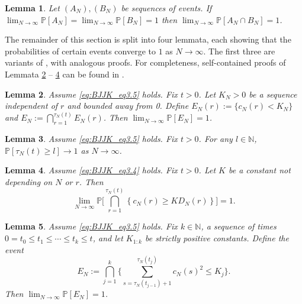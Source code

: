 \documentclass[12pt,authoryear]{article}
\newtheorem{lemma}{Lemma}
\theoremstyle{definition}
\newcommand{\Prob}{\mathbb{P}}
\newcommand{\1}[1]{\mathbbm{1}_{#1}}
\begin{document}
\begin{lemma}{\cite[Lemma 4.11]{brown2021thesis}}\label{thm:lim_AandB}
Let $(A_N) , (B_N)$ be sequences of events. 
If $\lim_{N\to\infty}\Prob[A_N] = \lim_{N\to\infty}\Prob[B_N]=1$ then $\lim_{N\to\infty} \Prob [A_N \cap B_N] =1$.
\end{lemma}

The remainder of this section is split into four lemmata, each showing that the probabilities of certain events converge to $1$ as $N\to\infty$.
The first three are variants of \citet[Supplement, Lemma 4]{koskela2022erratum}, with analogous proofs.
For completeness, self-contained proofs of Lemmata \ref{thm:indicators_cN} -- \ref{thm:indicators_DN} can be found in \citet[Lemmata 4.12--4.14]{brown2021thesis}.

\begin{lemma}\label{thm:indicators_cN}
Assume \eqref{eq:BJJK_eq3.5} holds. Fix $t>0$.
Let $K_N>0$ be a sequence independent of $r$ and bounded away from 0.
Define $E_N(r) := \{ c_N(r) < K_N \}$ and $E_N := \bigcap_{r=1}^{\tau_N(t)} E_N(r)$.
Then $\lim_{N\to\infty} \Prob[E_N]=1$.
\end{lemma}

\begin{lemma}\label{thm:indicators_tau}
Assume \eqref{eq:BJJK_eq3.5} holds.
Fix $t > 0$.
For any $l \in \mathbb{N}$, $\Prob[ \tau_N(t) \geq l ] \to 1$ as $N \to \infty$.
\end{lemma}

\begin{lemma}\label{thm:indicators_DN}
Assume \eqref{eq:BJJK_eq3.4} holds.
Fix $t>0$.
Let $K$ be a constant not depending on $N$ or $r$.
Then
\begin{equation*}
\lim_{N\to\infty} \Prob \Bigg[ \bigcap_{r=1}^{\tau_N(t)} 
        \left\{ c_N(r) \geq K D_N(r) \right\} \Bigg] 
= 1 . 
\end{equation*}
\end{lemma}

\begin{lemma}\label{thm:indicators_c2}
Assume \eqref{eq:BJJK_eq3.5} holds.
Fix $k\in\mathbb{N}$, a sequence of times $0 = t_0 \leq t_1 \leq \cdots \leq t_k \leq t$, and let $K_{ 1 : k }$ be strictly positive constants.
Define the event
\begin{equation*}
E_N := \bigcap_{j=1}^k \Bigg\{ \sum_{s=\tau_N(t_{j-1})+1}^{\tau_N(t_j)}
        c_N(s)^2 \leq K_j \Bigg\} .
\end{equation*}
Then $\lim_{N\to\infty} \Prob[E_N] =1$.
\end{lemma}
\end{document}
